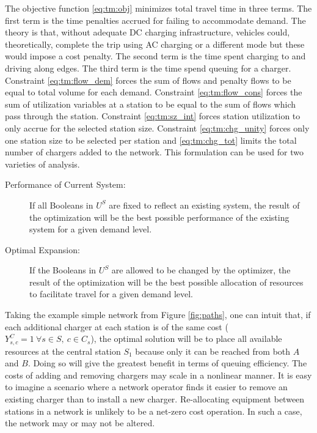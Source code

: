 The objective function \eqref{eq:tm:obj} minimizes total travel time in three terms. The first term is the time penalties accrued for failing to accommodate demand. The theory is that, without adequate DC charging infrastructure, vehicles could, theoretically, complete the trip using AC charging or a different mode but these would impose a cost penalty. The second term is the time spent charging to and driving along edges. The third term is the time spend queuing for a charger. Constraint \eqref{eq:tm:flow_dem} forces the sum of flows and penalty flows to be equal to total volume for each demand. Constraint \eqref{eq:tm:flow_cons} forces the sum of utilization variables at a station to be equal to the sum of flows which pass through the station. Constraint \eqref{eq:tm:sz_int} forces station utilization to only accrue for the selected station size. Constraint \eqref{eq:tm:chg_unity} forces only one station size to be selected per station and \eqref{eq:tm:chg_tot} limits the total number of chargers added to the network. This formulation can be used for two varieties of analysis.

\begin{description}
	\item [Performance of Current System:] If all Booleans in $U^S$ are fixed to reflect an existing system, the result of the optimization will be the best possible performance of the existing system for a given demand level.
	\item [Optimal Expansion:] If the Booleans in $U^S$ are allowed to be changed by the optimizer, the result of the optimization will be the best possible allocation of resources to facilitate travel for a given demand level.
\end{description}

Taking the example simple network from Figure \ref{fig:paths}, one can intuit that, if each additional charger at each station is of the same cost ($Y^C_{s, c} = 1\ \forall s\in S,\ c\in C_s$), the optimal solution will be to place all available resources at the central station $S_1$ because only it can be reached from both $A$ and $B$. Doing so will give the greatest benefit in terms of queuing efficiency. The costs of adding and removing chargers may scale in a nonlinear manner. It is easy to imagine a scenario where a network operator finds it easier to remove an existing charger than to install a new charger. Re-allocating equipment between stations in a network is unlikely to be a net-zero cost operation. In such a case, the network may or may not be altered.